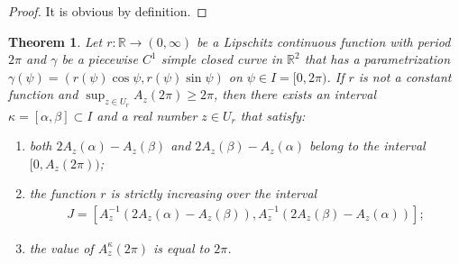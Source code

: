 \documentclass{amsart}
\theoremstyle{plain}
\newtheorem{theorem}{Theorem}[section]
\theoremstyle{definition}
\theoremstyle{remark}
\begin{document}
\begin{proof}%
It is obvious by definition. %
\end{proof}







\begin{theorem}\label{4.3} %
Let $r \colon \mathbb{R}\to(0,\infty)$ be a Lipschitz continuous function with period $2\pi$ and $\gamma$ be a piecewise $C^1$ simple closed curve in $\mathbb{R}^2$ that has a parametrization $\gamma(\psi)=(r(\psi)\cos\psi,r(\psi)\sin\psi)$ on $\psi\in I=[0,2\pi)$. 
If $r$ is not a constant function and $\sup_{z\in U_r}A_z(2\pi)\ge2\pi$, then there exists an interval $\kappa=[\alpha,\beta]\subset I$ and a real number $z\in U_r$ that satisfy:
\begin{enumerate}
\item both $2A_z(\alpha)-A_z(\beta)$ and $2A_z(\beta)-A_z(\alpha)$ belong to the interval $[0,A_z(2\pi))$;
\item the function $r$ is strictly increasing over the interval 
\begin{align*} 
J=[A_z^{-1}(2A_z(\alpha)-A_z(\beta)),A_z^{-1}(2A_z(\beta)-A_z(\alpha))];
\end{align*} 
\item the value of $A_z^{\kappa}(2\pi)$ is equal to $2\pi$.
\end{enumerate}
\end{theorem}
\end{document}
